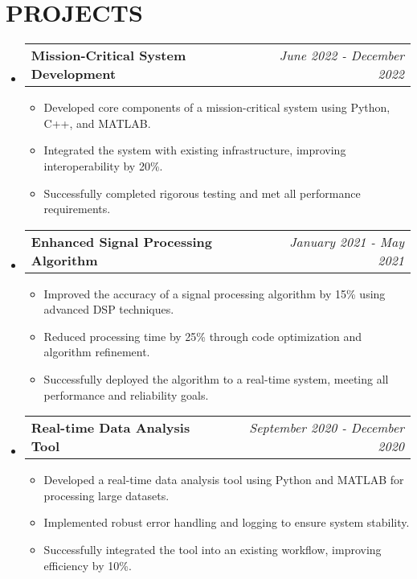 \documentclass[letterpaper,11pt]{article}
\makeatletter
\newcommand{\resumeItem}[1]{\item\small{{#1 \vspace{-3pt}}}}
\newcommand{\resumeProjectHeading}[2]{\item\begin{tabular*}{0.97\textwidth}{l@{\extracolsep{\fill}}r}\small#1 & #2 \\ \end{tabular*}\vspace{-7pt}}
\newcommand{\resumeSubHeadingListStart}{\begin{itemize}[leftmargin=0.15in, label={}]}
\newcommand{\resumeSubHeadingListEnd}{\end{itemize}}
\newcommand{\resumeItemListStart}{\begin{itemize}}
\newcommand{\resumeItemListEnd}{\end{itemize}\vspace{-5pt}}
\makeatother
\begin{document}
\section{{\fontsize{9pt}{20pt}\selectfont \textbf{PROJECTS}}}\resumeSubHeadingListStart
\resumeProjectHeading{\textbf{Mission-Critical System Development}}{\textit{June 2022 - December 2022}}
\resumeItemListStart
\resumeItem{Developed core components of a mission-critical system using Python, C++, and MATLAB.}
\resumeItem{Integrated the system with existing infrastructure, improving interoperability by 20\%.}
\resumeItem{Successfully completed rigorous testing and met all performance requirements.}
\resumeItemListEnd\vspace{-6pt}
\resumeProjectHeading{\textbf{Enhanced Signal Processing Algorithm}}{\textit{January 2021 - May 2021}}
\resumeItemListStart
\resumeItem{Improved the accuracy of a signal processing algorithm by 15\% using advanced DSP techniques.}
\resumeItem{Reduced processing time by 25\% through code optimization and algorithm refinement.}
\resumeItem{Successfully deployed the algorithm to a real-time system, meeting all performance and reliability goals.}
\resumeItemListEnd\vspace{-6pt}
\resumeProjectHeading{\textbf{Real-time Data Analysis Tool}}{\textit{September 2020 - December 2020}}
\resumeItemListStart
\resumeItem{Developed a real-time data analysis tool using Python and MATLAB for processing large datasets.}
\resumeItem{Implemented robust error handling and logging to ensure system stability.}
\resumeItem{Successfully integrated the tool into an existing workflow, improving efficiency by 10\%.}
\resumeItemListEnd
\resumeSubHeadingListEnd\vspace{-17pt}
\end{document}
